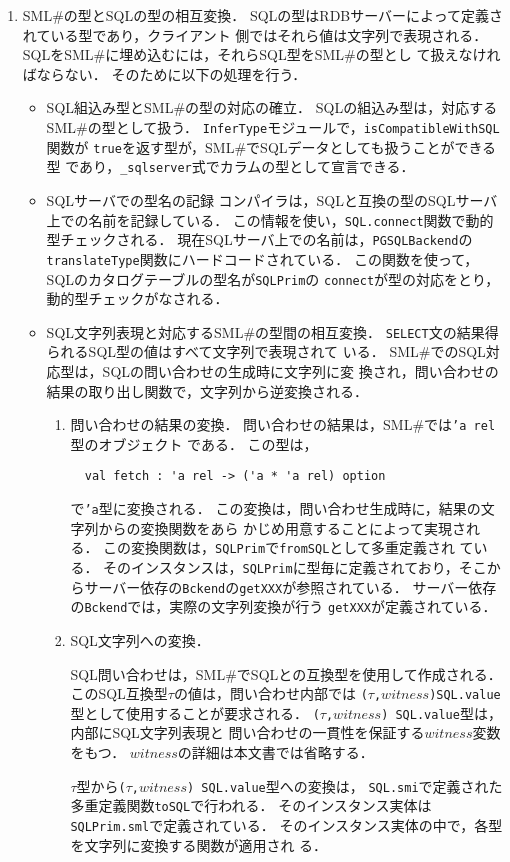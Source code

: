 \documentclass{jbook}
\newcommand{\smlsharp}{SML\#}
\newcommand{\code}[1]{\mbox{\large\tt #1}}
\begin{document}
\begin{enumerate}
\item \smlsharp{}の型とSQLの型の相互変換．
	SQLの型はRDBサーバーによって定義されている型であり，クライアント
側ではそれら値は文字列で表現される．
	SQLを\smlsharp{}に埋め込むには，それらSQL型を\smlsharp{}の型とし
て扱えなければならない．
	そのために以下の処理を行う．
\begin{itemize}
\item SQL組込み型と\smlsharp{}の型の対応の確立．
	SQLの組込み型は，対応する\smlsharp{}の型として扱う．
	\code{InferType}モジュールで，\code{isCompatibleWithSQL}関数が
\code{true}を返す型が，\smlsharp{}でSQLデータとしても扱うことができる型
であり，\code{\_sqlserver}式でカラムの型として宣言できる．
\item SQLサーバでの型名の記録
	コンパイラは，SQLと互換の型のSQLサーバ上での名前を記録している．
	この情報を使い，\code{SQL.connect}関数で動的型チェックされる．
	現在SQLサーバ上での名前は，\code{PGSQLBackend}の
\code{translateType}関数にハードコードされている．
	この関数を使って，SQLのカタログテーブルの型名が\code{SQLPrim}の
\code{connect}が型の対応をとり，動的型チェックがなされる．

\item SQL文字列表現と対応する\smlsharp{}の型間の相互変換．
	\code{SELECT}文の結果得られるSQL型の値はすべて文字列で表現されて
いる．
	\smlsharp{}でのSQL対応型は，SQLの問い合わせの生成時に文字列に変
換され，問い合わせの結果の取り出し関数で，文字列から逆変換される．
\begin{enumerate}
\item 問い合わせの結果の変換．
	問い合わせの結果は，\smlsharp{}では\code{'a rel}型のオブジェクト
である．
	この型は，
\begin{verbatim}
  val fetch : 'a rel -> ('a * 'a rel) option
\end{verbatim}
で{\tt 'a}型に変換される．
	この変換は，問い合わせ生成時に，結果の文字列からの変換関数をあら
かじめ用意することによって実現される．
	この変換関数は，\code{SQLPrim}で\code{fromSQL}として多重定義され
ている．
	そのインスタンスは，\code{SQLPrim}に型毎に定義されており，そこか
らサーバー依存の\code{Bckend}の\code{getXXX}が参照されている．
	サーバー依存の\code{Bckend}では，実際の文字列変換が行う
\code{getXXX}が定義されている．

\item SQL文字列への変換．

	SQL問い合わせは，\smlsharp{}でSQLとの互換型を使用して作成される．
	このSQL互換型$\tau$の値は，問い合わせ内部では
\code{($\tau$,$witness$)SQL.value}型として使用することが要求される．
	\code{($\tau$,$witness$) SQL.value}型は，内部にSQL文字列表現と
問い合わせの一貫性を保証する$witness$変数をもつ．
	$witness$の詳細は本文書では省略する．

	$\tau$型から\code{($\tau$,$witness$) SQL.value}型への変換は，
\code{SQL.smi}で定義された多重定義関数\code{toSQL}で行われる．
	そのインスタンス実体は\code{SQLPrim.sml}で定義されている．
	そのインスタンス実体の中で，各型を文字列に変換する関数が適用され
る．

\end{enumerate}
\end{itemize}
\end{enumerate}
\end{document}

